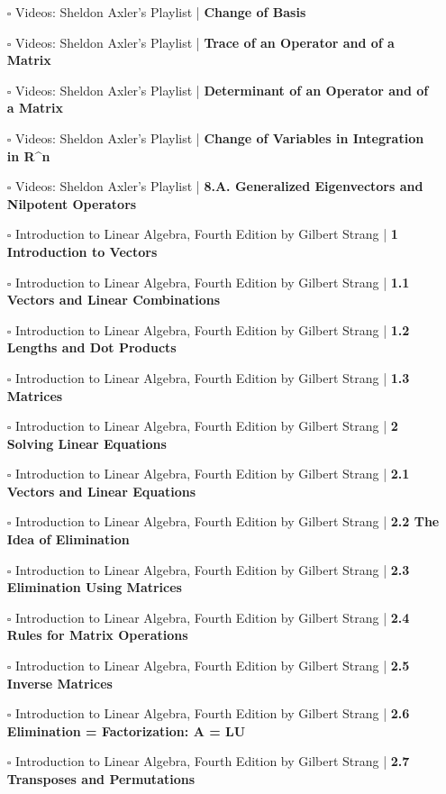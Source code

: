 \documentclass[a4, landscape, 12pt]{article}
\newcommand{\checkbox}{$\square$}%
\begin{document}
\begin{itemize}
{}
\item [\checkbox] Videos: Sheldon Axler’s Playlist  | \textbf{Change of Basis
}
\item [\checkbox] Videos: Sheldon Axler’s Playlist  | \textbf{Trace of an Operator and of a Matrix
}
\item [\checkbox] Videos: Sheldon Axler’s Playlist  | \textbf{Determinant of an Operator and of a Matrix
}
\item [\checkbox] Videos: Sheldon Axler’s Playlist  | \textbf{Change of Variables in Integration in R^n
}
\item [\checkbox] Videos: Sheldon Axler’s Playlist  | \textbf{8.A. Generalized Eigenvectors and Nilpotent Operators
}
\item [\checkbox] Introduction to Linear Algebra, Fourth Edition by Gilbert Strang  | \textbf{1 Introduction to Vectors
}
\item [\checkbox] Introduction to Linear Algebra, Fourth Edition by Gilbert Strang  | \textbf{1.1 Vectors and Linear Combinations
}
\item [\checkbox] Introduction to Linear Algebra, Fourth Edition by Gilbert Strang  | \textbf{1.2 Lengths and Dot Products
}
\item [\checkbox] Introduction to Linear Algebra, Fourth Edition by Gilbert Strang  | \textbf{1.3 Matrices
}
\item [\checkbox] Introduction to Linear Algebra, Fourth Edition by Gilbert Strang  | \textbf{2 Solving Linear Equations
}
\item [\checkbox] Introduction to Linear Algebra, Fourth Edition by Gilbert Strang  | \textbf{2.1 Vectors and Linear Equations
}
\item [\checkbox] Introduction to Linear Algebra, Fourth Edition by Gilbert Strang  | \textbf{2.2 The Idea of Elimination
}
\item [\checkbox] Introduction to Linear Algebra, Fourth Edition by Gilbert Strang  | \textbf{2.3 Elimination Using Matrices
}
\item [\checkbox] Introduction to Linear Algebra, Fourth Edition by Gilbert Strang  | \textbf{2.4 Rules for Matrix Operations
}
\item [\checkbox] Introduction to Linear Algebra, Fourth Edition by Gilbert Strang  | \textbf{2.5 Inverse Matrices
}
\item [\checkbox] Introduction to Linear Algebra, Fourth Edition by Gilbert Strang  | \textbf{2.6 Elimination = Factorization: A = LU
}
\item [\checkbox] Introduction to Linear Algebra, Fourth Edition by Gilbert Strang  | \textbf{2.7 Transposes and Permutations
}
\end{itemize}
\end{document}
